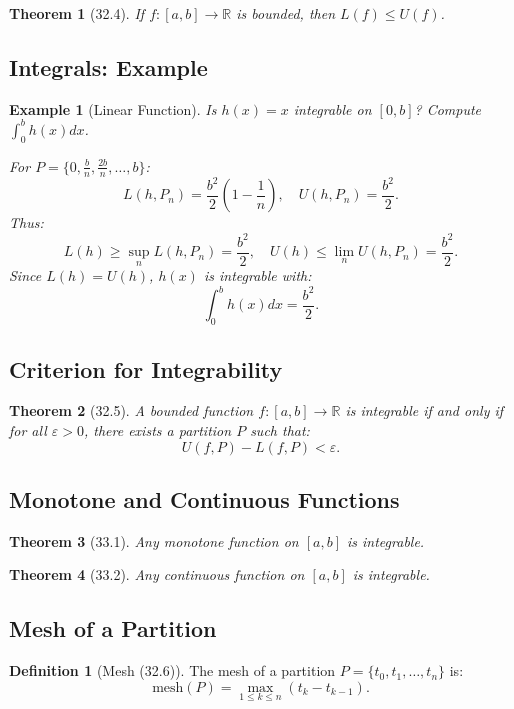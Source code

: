 \documentclass[9pt]{article}
\theoremstyle{definition}
\newtheorem{definition}{Definition}
\theoremstyle{plain}
\newtheorem{theorem}{Theorem}
\newtheorem{example}{Example}
\begin{document}
\begin{theorem}[32.4]
If \( f : [a, b] \to \mathbb{R} \) is bounded, then \( L(f) \leq U(f) \).
\end{theorem}

\subsection*{Integrals: Example}
\begin{example}[Linear Function]
Is \( h(x) = x \) integrable on \( [0, b] \)? Compute \( \int_0^b h(x) dx \).

For \( P = \{0, \frac{b}{n}, \frac{2b}{n}, \ldots, b\} \):
\[
L(h, P_n) = \frac{b^2}{2}\left(1 - \frac{1}{n}\right), \quad U(h, P_n) = \frac{b^2}{2}.
\]
Thus:
\[
L(h) \geq \sup_n L(h, P_n) = \frac{b^2}{2}, \quad U(h) \leq \lim_n U(h, P_n) = \frac{b^2}{2}.
\]
Since \( L(h) = U(h) \), \( h(x) \) is integrable with:
\[
\int_0^b h(x) dx = \frac{b^2}{2}.
\]
\end{example}

\subsection*{Criterion for Integrability}
\begin{theorem}[32.5]
A bounded function \( f : [a, b] \to \mathbb{R} \) is integrable if and only if for all \( \varepsilon > 0 \), there exists a partition \( P \) such that:
\[
U(f, P) - L(f, P) < \varepsilon.
\]
\end{theorem}

\subsection*{Monotone and Continuous Functions}
\begin{theorem}[33.1]
Any monotone function on \( [a, b] \) is integrable.
\end{theorem}

\begin{theorem}[33.2]
Any continuous function on \( [a, b] \) is integrable.
\end{theorem}

\subsection*{Mesh of a Partition}
\begin{definition}[Mesh (32.6)]
The mesh of a partition \( P = \{t_0, t_1, \ldots, t_n\} \) is:
\[
\text{mesh}(P) = \max_{1 \leq k \leq n} (t_k - t_{k-1}).
\]
\end{definition}
\end{document}
